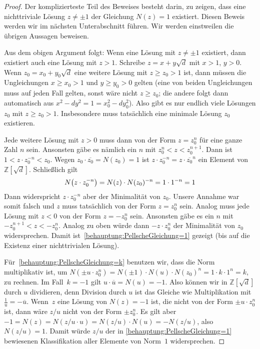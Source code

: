 \begin{proof}
	Der komplizierteste Teil des Beweises besteht darin, zu zeigen, dass eine nichttriviale Lösung $z\neq \pm1$ der Gleichung $N(z)=1$ existiert. Diesen Beweis werden wir im nächsten Unterabschnitt führen. Wir werden einstweilen die übrigen Aussagen beweisen.
	
	Aus dem obigen Argument folgt: Wenn eine Lösung mit $z\neq \pm 1$ existiert, dann existiert auch eine Lösung mit $z>1$. Schreibe $z=x+y\sqrt{d}$ mit $x> 1$, $y> 0$. Wenn $z_0=x_0+y_0\sqrt{d}$ eine weitere Lösung mit $z\geqslant z_0>1$ ist, dann müssen die Ungleichungen $x\geqslant x_0> 1$ und $y\geqslant y_0> 0$ gelten (eine von beiden Ungleichungen muss auf jeden Fall gelten, sonst wäre nicht $z\geqslant z_0$; die andere folgt dann automatisch aus $x^2-dy^2=1=x_0^2-dy_0^2$). Also gibt es nur endlich viele Lösungen $z_0$ mit $z\geqslant z_0>1$. Insbesondere muss tatsächlich eine minimale Lösung $z_0$ existieren.
	
	Jede weitere Lösung mit $z> 0$ muss dann von der Form $z=z_0^n$ für eine ganze Zahl $n$ sein. Ansonsten gäbe es nämlich ein $n$ mit $z_0^{n}<z<z_0^{n+1}$. Dann ist $1<z\cdot z_0^{-n}<z_0$. Wegen $z_0\cdot \overline{z_0}=N(z_0)=1$ ist $z\cdot z_0^{-n}=z\cdot \overline{z_0}^{n}$ ein Element von $\mathbb Z[\sqrt{d}]$. Schließlich gilt
	\begin{equation*}
		N\parens*{z\cdot z_0^{-n}}=N(z)\cdot N(z_0)^{-n}=1\cdot 1^{-n}=1
	\end{equation*}
	Dann widerspricht $z\cdot z_0^{-n}$ aber der Minimalität von $z_0$. Unsere Annahme war somit falsch und $z$ muss tatsächlich von der Form $z=z_0^n$ sein. Analog muss jede Lösung mit $z<0$ von der Form $z=-z_0^n$ sein. Ansonsten gäbe es ein $n$ mit $-z_0^{n+1}<z<-z_0^n$. Analog zu oben würde dann $-z\cdot z_0^n$ der Minimalität von $z_0$ widersprechen. Damit ist~\ref{behauptung:PellscheGleichung=1} gezeigt (bis auf die Existenz einer nichttrivialen Lösung).
	
	Für~\ref{behauptung:PellscheGleichung=k} benutzen wir, dass die Norm multiplikativ ist, um $N(\pm u\cdot z_0^n)=N(\pm 1)\cdot N(u)\cdot N(z_0)^n=1\cdot k\cdot 1^n=k$, zu rechnen. Im Fall~$k=-1$ gilt $u\cdot \overline{u}=N(u)=-1$. Also können wir in $\mathbb Z[\sqrt{d}]$ durch $u$ dividieren, denn Division durch $u$ ist das Gleiche wie Multiplikation mit $\frac 1u=-\overline{u}$. Wenn~$z$ eine Lösung von $N(z)=-1$ ist, die nicht von der Form $\pm u\cdot z_0^n$ ist, dann wäre $z/u$ nicht von der Form $\pm z_0^n$. Es gilt aber $-1=N(z)=N(z/u\cdot u)=N(z/u)\cdot N(u)=-N(z/u)$, also $N(z/u)=1$. Damit würde $z/u$ der in \ref{behauptung:PellscheGleichung=1} bewiesenen Klassifikation aller Elemente von Norm~$1$ widersprechen.
\end{proof}

